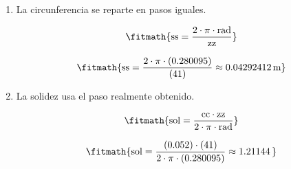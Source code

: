 \begin{enumerate}

\item La circunferencia se reparte en pasos iguales.

\[\fitmath{\mathrm{ss}=\frac{2\cdot \pi\cdot \mathrm{rad}}{\mathrm{zz}}}\]

\[\fitmath{\mathrm{ss}=\frac{2\cdot \pi\cdot (0.280095)}{(41)}\approx 0.04292412\,\mathrm{m}}\]

\item La solidez usa el paso realmente obtenido.

\[\fitmath{\mathrm{sol}=\frac{\mathrm{cc}\cdot \mathrm{zz}}{2\cdot \pi\cdot \mathrm{rad}}}\]

\[\fitmath{\mathrm{sol}=\frac{(0.052)\cdot (41)}{2\cdot \pi\cdot (0.280095)}\approx 1.21144\,}\]

\end{enumerate}
